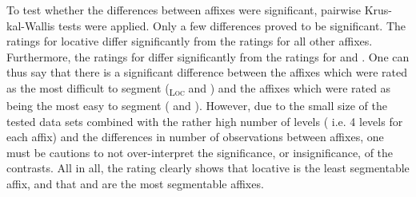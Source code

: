 \begin{table}

	\caption{Semantic Transparency Rating  by affix }
	\label{tbl:Corpus distribution semantic transparency rating}

	

	
\end{table}




To test whether the differences between affixes were significant, pairwise Krus-kal-Wallis tests were applied.  Only a few differences proved to be significant. The ratings for locative  differ significantly from the ratings for all other affixes. Furthermore, the ratings for  differ significantly from the ratings for  and . 
One can thus say that there is a significant difference between the affixes which were rated as the most difficult to segment (\textsubscript{\textsc{Loc}} and ) and the affixes which were rated as being the most easy to segment ( and ). However, due to the small size of the tested data sets combined with the rather high number of levels ( i.e. 4 levels for each affix) and the differences in number of observations between affixes, one must be cautions to not over-interpret the significance, or insignificance, of the contrasts. 
All in all, the rating clearly shows that locative  is the least segmentable affix, and that  and  are the most segmentable affixes.



